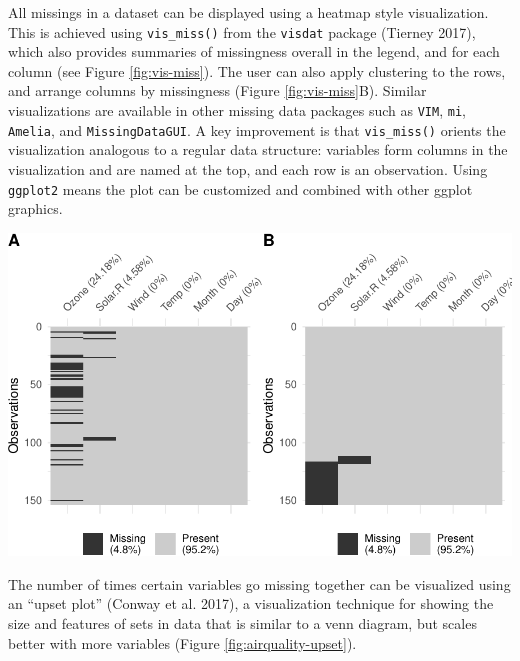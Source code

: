 \documentclass[]{article}
\let\origfigure\figure
\let\endorigfigure\endfigure
\renewenvironment{figure}[1][2] {
    \expandafter\origfigure\expandafter[H]
} {
    \endorigfigure
}
\theoremstyle{definition}
\theoremstyle{definition}
\theoremstyle{definition}
\theoremstyle{remark}
\begin{document}
All missings in a dataset can be displayed using a heatmap style
visualization. This is achieved using \texttt{vis\_miss()} from the
\texttt{visdat} package (Tierney 2017), which also provides summaries of
missingness overall in the legend, and for each column (see Figure
\ref{fig:vis-miss}). The user can also apply clustering to the rows, and
arrange columns by missingness (Figure \ref{fig:vis-miss}B). Similar
visualizations are available in other missing data packages such as
\texttt{VIM}, \texttt{mi}, \texttt{Amelia}, and \texttt{MissingDataGUI}.
A key improvement is that \texttt{vis\_miss()} orients the visualization
analogous to a regular data structure: variables form columns in the
visualization and are named at the top, and each row is an observation.
Using \texttt{ggplot2} means the plot can be customized and combined
with other ggplot graphics.

\begin{figure}

{\centering \includegraphics[width=0.95\linewidth]{tidy-missing-data-paper_files/figure-latex/vis-miss-1} 

}

\caption{Heatmap visualizations of missing data for the airquality dataset. (A) The default output and (B) ordered by clustering on rows and columns. There are only missings in ozone and solar radiation, and there appears to be some structure to their missingness.}\label{fig:vis-miss}
\end{figure}

The number of times certain variables go missing together can be
visualized using an ``upset plot'' (Conway et al. 2017), a visualization
technique for showing the size and features of sets in data that is
similar to a venn diagram, but scales better with more variables (Figure
\ref{fig:airquality-upset}).
\end{document}
